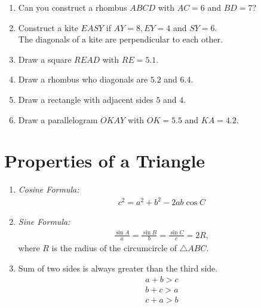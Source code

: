 \documentclass[journal,12pt,twocolumn]{IEEEtran}
\renewcommand\thesection{\arabic{section}}
\begin{document}
\begin{enumerate}[label=\thesection.\arabic*
,ref=\thesection.\theenumi]
\item Can you construct a rhombus $ABCD$ with $AC = 6$ and $BD = 7$?
\item Construct a kite $EASY$ if $AY = 8, EY = 4$ and $SY = 6$.
\\
\solution The diagonals of a kite are perpendicular to each other.
\item Draw a square $READ$ with $RE = 5.1$.
\item Draw a rhombus who diagonals are $5.2$ and $6.4$.
\item Draw a rectangle with adjacent sides $5$ and $4$.
\item Draw a parallelogram $OKAY$ with $OK = 5.5$ and $KA = 4.2$.

\end{enumerate}
\section{Properties of a Triangle}
\begin{enumerate}[label=\thesection.\arabic*
,ref=\thesection.\theenumi]
\item {\em Cosine Formula:} 
\begin{align}
c^2 = a^2+b^2-2ab\cos C
\end{align}
\item {\em Sine Formula:} 
\begin{align}
\frac{\sin A}{a} = \frac{\sin B}{b} = \frac{\sin C}{c}=2R, 
\end{align}
%
where $R$ is the radius of the circumcircle of $\triangle ABC$.
\item Sum of two sides is always greater than the third side.
\begin{align}
a+b > c
\\
b+c > a
\\
c+a > b
\end{align}
\end{enumerate}
\end{document}
